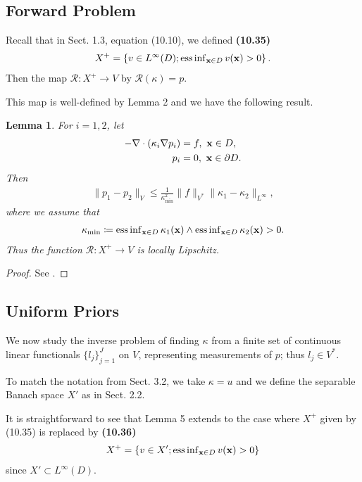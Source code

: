 \documentclass[oneside,11pt]{book}
\numberwithin{equation}{section}
\newtheorem{lemma}{Lemma}[section]
\begin{document}
\subsection{Forward Problem}
Recall that in Sect. 1.3, equation (10.10), we defined \textbf{(10.35)}
\begin{align*}
    X^+ = \left\{v\in L^\infty(D);\operatorname{ess\inf}_{{\bf x}\in D} v({\bf x}) > 0\right\}.
\end{align*}
Then the map $\mathcal{R}:X^+\to V$ by $\mathcal{R}(\kappa) = p$.

This map is well-defined by Lemma 2 and we have the following result.

\begin{lemma}
    For $i = 1,2$, let
    \begin{align*}
        -\nabla\cdot(\kappa_i\nabla p_i) &= f,\ {\bf x}\in D,\\
        p_i &= 0,\ {\bf x}\in\partial D.
    \end{align*}
    Then
    \begin{align*}
        \|p_1 - p_2\|_V\le\frac{1}{\kappa_{\min}^2}\|f\|_{V^*}\|\kappa_1 - \kappa_2\|_{L^\infty},
    \end{align*}
    where we assume that
    \begin{align*}
        \kappa_{\min}\coloneqq\operatorname{ess\inf}_{{\bf x}\in D} \kappa_1({\bf x})\wedge\operatorname{ess\inf}_{{\bf x}\in D} \kappa_2({\bf x}) > 0.
    \end{align*}
    Thus the function $\mathcal{R}:X^+\to V$ is locally Lipschitz.
\end{lemma}

\begin{proof}
    See \cite[p. 346]{Dashti_Stuart2017}.
\end{proof}

\subsection{Uniform Priors}
We now study the inverse problem of finding $\kappa$ from a finite set of continuous linear functionals $\{l_j\}_{j=1}^J$ on $V$, representing measurements of $p$; thus $l_j\in V^*$.

To match the notation from Sect. 3.2, we take $\kappa = u$ and we define the separable Banach space $X'$ as in Sect. 2.2.

It is straightforward to see that Lemma 5 extends to the case where $X^+$ given by (10.35) is replaced by \textbf{(10.36)}
\begin{align*}
    X^+ = \left\{v\in X';\operatorname{ess\inf}_{{\bf x}\in D} v({\bf x}) > 0\right\}
\end{align*}
since $X'\subset L^\infty(D)$.
\end{document}
